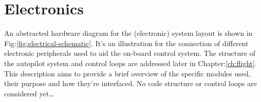 \section{Electronics}
\label{sec:proto.layout}
{\centering
{}
}
\newpage
An abstracted hardware diagram for the (electronic) system layout is shown in Fig:\ref{fig:electrical-schematic}. It's an illustration for the connection of different electronic peripherals used to aid the on-board control system. The structure of the autopilot system and control loops are addressed later in Chapter:\ref{ch:flight}. This description aims to provide a brief overview of the specific modules used, their purpose and how they're interfaced. No code structure or control loops are considered yet\ldots
